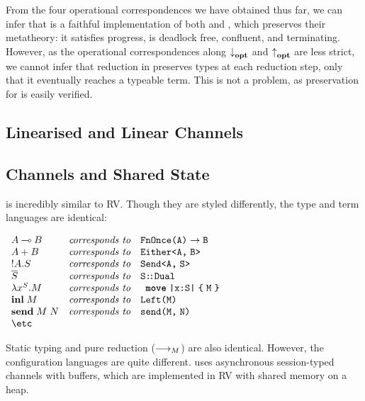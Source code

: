 \documentclass[sigplan,review,anonymous]{acmart}
\begin{document}
From the four operational correspondences we have obtained thus far, we can infer that \affineAGV is a faithful implementation of both \linearEGV and \affineEGV, which preserves their metatheory: it satisfies progress, is deadlock free, confluent, and terminating. However, as the operational correspondences along $\relax{{\downarrow}_{\mathbf{opt}}}\relax{}$ and $\relax{{\uparrow}_{\mathbf{opt}}}\relax{}$ are less strict, we cannot infer that reduction in \affineAGV preserves types at each reduction step, only that it eventually reaches a typeable term. This is not a problem, as preservation for \affineAGV is easily verified.

\subsection{Linearised and Linear Channels}

\subsection{Channels and Shared State}
\affineAGV is incredibly similar to RV. Though they are styled differently, the type and term languages are identical:
\begin{center}
  \(
  \begin{array}{lcl}
    \gvTyFun{A}{B}  & \textit{corresponds to} & \rvTyFun{A}{B}
    \\
    \gvTySum{A}{B}  & \textit{corresponds to} & \rvTySum{A}{B}
    \\
    \gvTySend{A}{S} & \textit{corresponds to} & \rvTySend{A}{S}
    \\
    \gvDual{S}      & \textit{corresponds to} & \rvDual{S}
    \\
    \gvAbs[S]{x}{M} & \textit{corresponds to} & \rvAbs[S]{x}{M}
    \\
    \gvInl{M}       & \textit{corresponds to} & \rvInl{M}
    \\
    \gvSend{M}{N}   & \textit{corresponds to} & \rvSend{M}{N}
    \\
    \text{\etc}
  \end{array}
  \)
\end{center}
Static typing and pure reduction ($\mathrel{\relax{\longrightarrow_{M}}}$) are also identical. However, the configuration languages are quite different. \affineAGV uses asynchronous session-typed channels with buffers, which are implemented in RV with shared memory on a heap.
\end{document}
